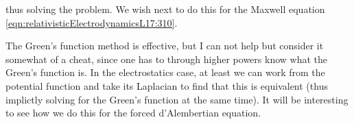 thus solving the problem.  We wish next to do this for the Maxwell equation \ref{eqn:relativisticElectrodynamicsL17:310}.

The Green's function method is effective, but I can not help but consider it somewhat of a cheat, since one has to through higher powers know what the Green's function is.  In the electrostatics case, at least we can work from the potential function and take its Laplacian to find that this is equivalent (thus implictly solving for the Green's function at the same time).  It will be interesting to see how we do this for the forced d'Alembertian equation.
